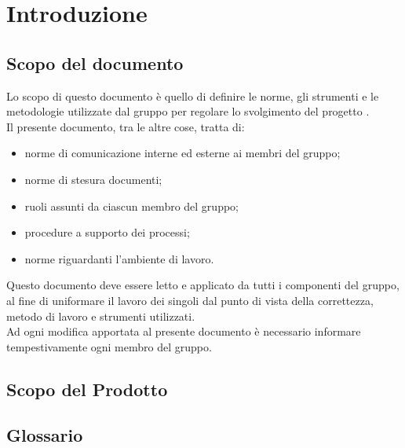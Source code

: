 \section{Introduzione}

\subsection{Scopo del documento}

Lo scopo di questo documento è quello di definire le norme, gli strumenti e le metodologie utilizzate dal gruppo \GroupName{} per regolare lo svolgimento del progetto \ProjectName{}.\\
Il presente documento, tra le altre cose, tratta di:
\begin{itemize}
	\item norme di comunicazione interne ed esterne ai membri del gruppo;
	\item norme di stesura documenti;
	\item ruoli assunti da ciascun membro del gruppo;
	\item procedure a supporto dei processi;
	\item norme riguardanti l’ambiente di lavoro.
\end{itemize}
Questo documento deve essere letto e applicato da tutti i componenti del gruppo, al fine di uniformare il lavoro dei singoli dal punto di vista della correttezza, metodo di lavoro e strumenti utilizzati.\\
Ad ogni modifica apportata al presente documento è necessario informare tempestivamente ogni membro del gruppo.
\subsection{Scopo del Prodotto}
\ScopoDelProdotto

\subsection{Glossario}
\GlossarioIntroduzione






